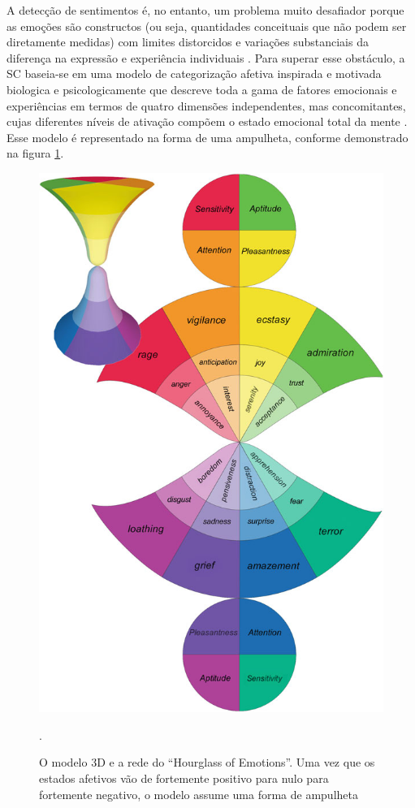 \documentclass[
	12pt,				%
	openright,			%
	oneside,			%
	a4paper,			%
	english,			%
	spanish,			%
	brazil				%
	]{abntex2}
\begin{document}
A detecção de sentimentos é, no entanto, um problema muito desafiador porque as emoções são constructos (ou seja, quantidades conceituais que não podem ser diretamente medidas) com limites distorcidos e variações substanciais da diferença na expressão e experiência individuais \cite{inBook_Bisio2016} . Para superar esse obstáculo, a SC baseia-se em uma modelo de categorização afetiva inspirada e motivada biologica e  psicologicamente que descreve toda a gama de fatores emocionais e experiências em termos de quatro dimensões independentes, mas concomitantes, cujas diferentes níveis de ativação compõem o estado emocional total da mente \cite{book_Cambria2015}. Esse modelo é representado na forma de uma ampulheta, conforme demonstrado na figura \ref{SenticHourGlass}.


\begin{figure}[!htb]
\centering
\includegraphics[scale=1.4]{SenticHourGlass}
\caption {O modelo 3D e a rede do ``Hourglass of Emotions''. Uma vez que os estados afetivos vão de fortemente positivo para nulo para fortemente negativo, o modelo assume uma forma de ampulheta \cite{book_Cambria2015}}.
\label{SenticHourGlass}
\end{figure}
\end{document}
